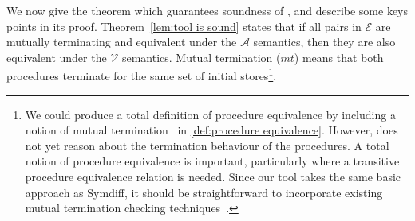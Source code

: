 \documentclass[runningheads,a4paper]{llncs}
\newcommand*{\equivmap}{\mathcal{E}}
\newcommand*{\muttermname}{\mathit{mt}}
\newcommand*\Asemantics{\mathcal{A}}
\newcommand*\asemantics{$\Asemantics$ semantics}
\newcommand*\Vsemantics{\mathcal{V}}
\newcommand*\vsemantics{$\Vsemantics$ semantics}
\begin{document}
We now give the theorem which guarantees soundness of \metho{}, and describe some keys points in its proof. Theorem~\ref{lem:tool is sound} states that if all pairs in $\equivmap$ are mutually terminating and equivalent under the \asemantics{}, then they are also equivalent under the \vsemantics{}. Mutual termination ($\muttermname$) means that both procedures terminate for the same set of initial stores\footnote{We could produce a total definition of procedure equivalence by including a notion of mutual termination~\cite{Hawblitzel2013,Elenbogen2015} in \cref{def:procedure equivalence}. However, \tool{} does not yet reason about the termination behaviour of the procedures. A total notion of procedure equivalence is important, particularly where a transitive procedure equivalence relation is needed. Since our tool takes the same basic approach as Symdiff, it should be straightforward to incorporate existing mutual termination checking techniques~\cite{Godlin08,Hawblitzel2013,Elenbogen2015}.}.
\end{document}
